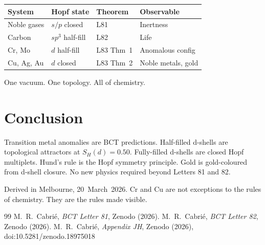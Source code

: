 \documentclass[aps,prl,twocolumn,showpacs,superscriptaddress]{revtex4-2}
\begin{document}
\begin{center}
\begin{tabular}{llll}
\toprule
System & Hopf state & Theorem & Observable \\
\midrule
Noble gases & $s/p$ closed & L81 & Inertness \\
Carbon & $sp^3$ half-fill & L82 & Life \\
Cr, Mo & $d$ half-fill & L83 Thm~1 & Anomalous config \\
Cu, Ag, Au & $d$ closed & L83 Thm~2 & Noble metals, gold \\
\bottomrule
\end{tabular}
\end{center}

One vacuum. One topology. All of chemistry.

\section{Conclusion}

Transition metal anomalies are BCT predictions. Half-filled 
d-shells are topological attractors at $S_H(d)=0.50$. Fully-filled 
d-shells are closed Hopf multiplets. Hund's rule is the Hopf 
symmetry principle. Gold is gold-coloured from d-shell closure. 
No new physics required beyond Letters 81 and 82.

\begin{acknowledgments}
Derived in Melbourne, 20~March~2026. Cr and Cu are not exceptions 
to the rules of chemistry. They are the rules made visible.
\end{acknowledgments}

\begin{thebibliography}{99}
 M.~R.~Cabri\'e, \textit{BCT Letter 81}, Zenodo (2026).
 M.~R.~Cabri\'e, \textit{BCT Letter 82}, Zenodo (2026).
 M.~R.~Cabri\'e, \textit{Appendix JH}, Zenodo (2026),
doi:10.5281/zenodo.18975018
\end{thebibliography}
\end{document}
